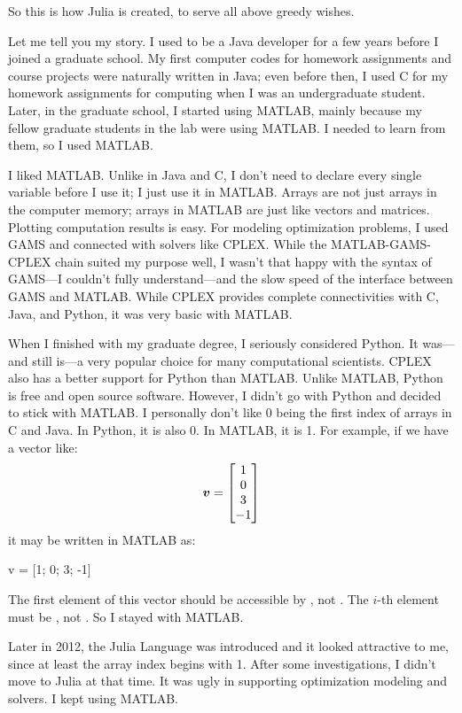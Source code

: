 So this is how Julia is created, to serve all above greedy wishes.

Let me tell you my story. I used to be a Java developer for a few years before I joined a graduate school. My first computer codes for homework assignments and course projects were naturally written in Java; even before then, I used C for my homework assignments for computing when I was an undergraduate student. Later, in the graduate school, I started using MATLAB, mainly because my fellow graduate students in the lab were using MATLAB. I needed to learn from them, so I used MATLAB.

I liked MATLAB. Unlike in Java and C, I don't need to declare every single variable before I use it; I just use it in MATLAB. Arrays are not just arrays in the computer memory; arrays in MATLAB are just like vectors and matrices. Plotting computation results is easy. For modeling optimization problems, I used GAMS and connected with solvers like CPLEX. While the MATLAB-GAMS-CPLEX chain suited my purpose well, I wasn't that happy with the syntax of GAMS---I couldn't fully understand---and the slow speed of the interface between GAMS and MATLAB. While CPLEX provides complete connectivities with C, Java, and Python, it was very basic with MATLAB.

When I finished with my graduate degree, I seriously considered Python. It was---and still is---a very popular choice for many computational scientists. CPLEX also has a better support for Python than MATLAB. Unlike MATLAB, Python is free and open source software. However, I didn't go with Python and decided to stick with MATLAB. I personally don't like 0 being the first index of arrays in C and Java. In Python, it is also 0. In MATLAB, it is 1. For example, if we have a vector like:
\[
    \boldsymbol{v} = \begin{bmatrix} 1 \\ 0 \\ 3 \\ -1 \end{bmatrix}
\]
it may be written in MATLAB as:
\begin{code}
v = [1; 0; 3; -1]
\end{code}
The first element of this vector should be accessible by , not . The $i$-th element must be , not . So I stayed with MATLAB.

Later in 2012, the Julia Language was introduced and it looked attractive to me, since at least the array index begins with 1. After some investigations, I didn't move to Julia at that time. It was ugly in supporting optimization modeling and solvers. I kept using MATLAB.

